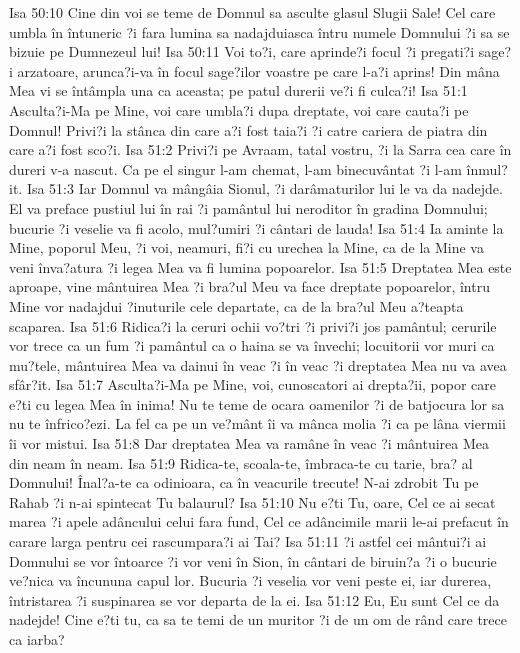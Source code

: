 Isa 50:10  Cine din voi se teme de Domnul sa asculte glasul Slugii Sale! Cel care umbla în întuneric ?i fara lumina sa nadajduiasca întru numele Domnului ?i sa se bizuie pe Dumnezeul lui!
Isa 50:11  Voi to?i, care aprinde?i focul ?i pregati?i sage?i arzatoare, arunca?i-va în focul sage?ilor voastre pe care l-a?i aprins! Din mâna Mea vi se întâmpla una ca aceasta; pe patul durerii ve?i fi culca?i!
Isa 51:1  Asculta?i-Ma pe Mine, voi care umbla?i dupa dreptate, voi care cauta?i pe Domnul! Privi?i la stânca din care a?i fost taia?i ?i catre cariera de piatra din care a?i fost sco?i.
Isa 51:2  Privi?i pe Avraam, tatal vostru, ?i la Sarra cea care în dureri v-a nascut. Ca pe el singur l-am chemat, l-am binecuvântat ?i l-am înmul?it.
Isa 51:3  Iar Domnul va mângâia Sionul, ?i darâmaturilor lui le va da nadejde. El va preface pustiul lui în rai ?i pamântul lui neroditor în gradina Domnului; bucurie ?i veselie va fi acolo, mul?umiri ?i cântari de lauda!
Isa 51:4  Ia aminte la Mine, poporul Meu, ?i voi, neamuri, fi?i cu urechea la Mine, ca de la Mine va veni înva?atura ?i legea Mea va fi lumina popoarelor.
Isa 51:5  Dreptatea Mea este aproape, vine mântuirea Mea ?i bra?ul Meu va face dreptate popoarelor, întru Mine vor nadajdui ?inuturile cele departate, ca de la bra?ul Meu a?teapta scaparea.
Isa 51:6  Ridica?i la ceruri ochii vo?tri ?i privi?i jos pamântul; cerurile vor trece ca un fum ?i pamântul ca o haina se va învechi; locuitorii vor muri ca mu?tele, mântuirea Mea va dainui în veac ?i în veac ?i dreptatea Mea nu va avea sfâr?it.
Isa 51:7  Asculta?i-Ma pe Mine, voi, cunoscatori ai drepta?ii, popor care e?ti cu legea Mea în inima! Nu te teme de ocara oamenilor ?i de batjocura lor sa nu te înfrico?ezi. La fel ca pe un ve?mânt îi va mânca molia ?i ca pe lâna viermii îi vor mistui.
Isa 51:8  Dar dreptatea Mea va ramâne în veac ?i mântuirea Mea din neam în neam.
Isa 51:9  Ridica-te, scoala-te, îmbraca-te cu tarie, bra? al Domnului! Înal?a-te ca odinioara, ca în veacurile trecute! N-ai zdrobit Tu pe Rahab ?i n-ai spintecat Tu balaurul?
Isa 51:10  Nu e?ti Tu, oare, Cel ce ai secat marea ?i apele adâncului celui fara fund, Cel ce adâncimile marii le-ai prefacut în carare larga pentru cei rascumpara?i ai Tai?
Isa 51:11  ?i astfel cei mântui?i ai Domnului se vor întoarce ?i vor veni în Sion, în cântari de biruin?a ?i o bucurie ve?nica va încununa capul lor. Bucuria ?i veselia vor veni peste ei, iar durerea, întristarea ?i suspinarea se vor departa de la ei.
Isa 51:12  Eu, Eu sunt Cel ce da nadejde! Cine e?ti tu, ca sa te temi de un muritor ?i de un om de rând care trece ca iarba?

